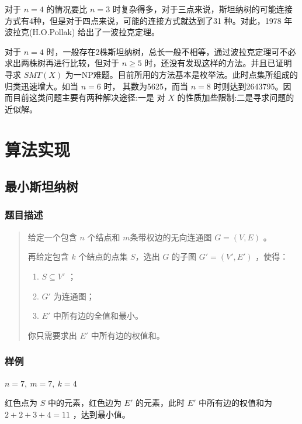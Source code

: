 \documentclass{SCIS2022cn}
\begin{document}
对于 $n=4$ 的情况要比 $n=3$ 时复杂得多，对于三点来说，斯坦纳树的可能连接方式有4种，但是对于四点来说，可能的连接方式就达到了31\cite{2} 种。对此，1978 年波拉克(H.O.Pollak) 给出了一波拉克定理。

对于 $n=4$ 时，一般存在2株斯坦纳树，总长一般不相等，通过波拉克定理可不必求出两株树再进行比较，但对于 $n \geq 5$ 时，还没有发现这样的方法。并且已证明寻求 $SMT(X)$ 为一NP难题。目前所用的方法基本是枚举法。此时点集所组成的归类迅速增大。如当 $n=6$ 时， 其数为5625，而当 $n=8$ 时则达到2643795。因而目前这类问题主要有两种解决途径:一是 对 $X$ 的性质加些限制:二是寻求问题的近似解。

\section{算法实现}

\subsection{最小斯坦纳树}

\subsubsection*{题目描述}

\begin{quotation}
    给定一个包含 $n$ 个结点和 $m$条带权边的无向连通图 $G=(V,E)$ 。

    再给定包含 $k$ 个结点的点集 $S$，选出 $G$ 的子图 $G'=(V',E')$ ，使得：
    \begin{enumerate}
        \item $S \subseteq V'$ ；
        \item $G'$ 为连通图；
        \item $E'$ 中所有边的全值和最小。
    \end{enumerate}

    你只需要求出 $E'$ 中所有边的权值和。
\end{quotation}

\subsubsection*{样例}

$n=7,\ m=7,\ k=4$

红色点为 $S$ 中的元素，红色边为 $E'$ 的元素，此时 $E'$ 中所有边的权值和为 $2+2+3+4=11$ ，达到最小值。
\end{document}
